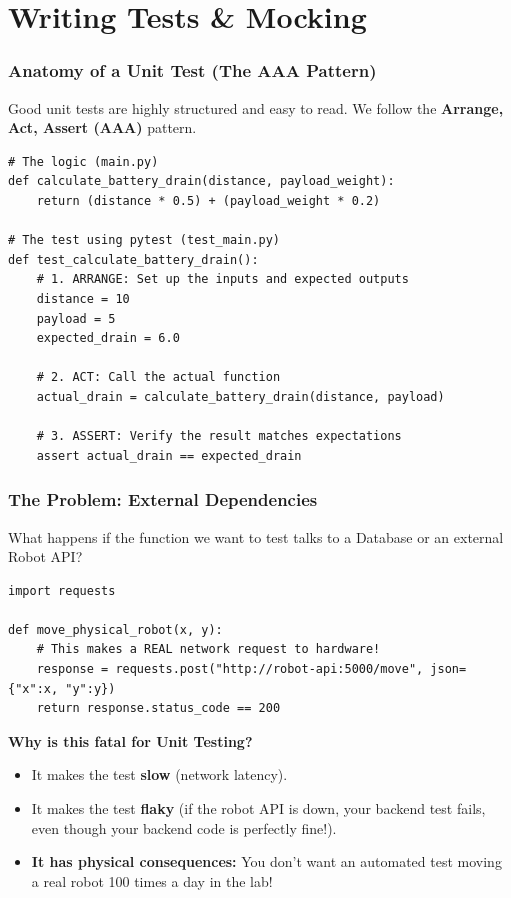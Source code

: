 \documentclass[xcolor=table]{beamer}
\begin{document}
\section{Writing Tests \& Mocking}

\begin{frame}[fragile]
    \frametitle{Anatomy of a Unit Test (The AAA Pattern)}
    Good unit tests are highly structured and easy to read. We follow the \textbf{Arrange, Act, Assert (AAA)} pattern.
    
    \begin{verbatim}
# The logic (main.py)
def calculate_battery_drain(distance, payload_weight):
    return (distance * 0.5) + (payload_weight * 0.2)

# The test using pytest (test_main.py)
def test_calculate_battery_drain():
    # 1. ARRANGE: Set up the inputs and expected outputs
    distance = 10
    payload = 5
    expected_drain = 6.0
    
    # 2. ACT: Call the actual function
    actual_drain = calculate_battery_drain(distance, payload)
    
    # 3. ASSERT: Verify the result matches expectations
    assert actual_drain == expected_drain
    \end{verbatim}
\end{frame}

\begin{frame}[fragile]
    \frametitle{The Problem: External Dependencies}
    What happens if the function we want to test talks to a Database or an external Robot API?
    
    \begin{verbatim}
import requests

def move_physical_robot(x, y):
    # This makes a REAL network request to hardware!
    response = requests.post("http://robot-api:5000/move", json={"x":x, "y":y})
    return response.status_code == 200
    \end{verbatim}
    
    \vspace{0.2cm}
    \textbf{Why is this fatal for Unit Testing?}
    \begin{itemize}
        \item It makes the test \textbf{slow} (network latency).
        \item It makes the test \textbf{flaky} (if the robot API is down, your backend test fails, even though your backend code is perfectly fine!).
        \item \textbf{It has physical consequences:} You don't want an automated test moving a real robot 100 times a day in the lab!
    \end{itemize}
\end{frame}
\end{document}
